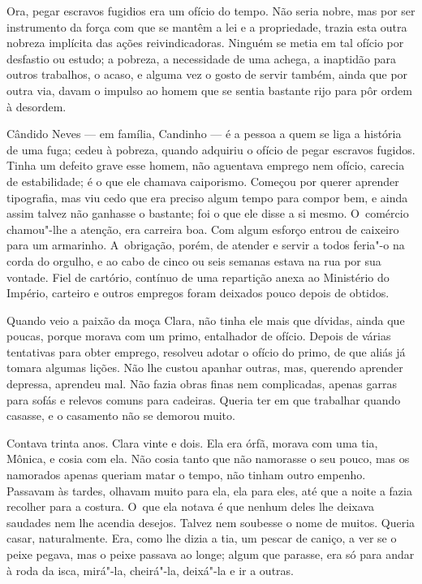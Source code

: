 \begin{linenumbers}
Ora, pegar escravos fugidios era um ofício do tempo. Não seria nobre,
mas por ser instrumento da força com que se mantêm a lei e a
propriedade, trazia esta outra nobreza implícita das ações
reivindicadoras. Ninguém se metia em tal ofício por desfastio ou estudo;
a pobreza, a necessidade de uma achega, a inaptidão para outros
trabalhos, o acaso, e alguma vez o gosto de servir também, ainda que por
outra via, davam o impulso ao homem que se sentia bastante rijo para pôr
ordem à desordem.

Cândido Neves --- em família, Candinho --- é a pessoa a quem se liga a
história de uma fuga; cedeu à pobreza, quando adquiriu o ofício de pegar
escravos fugidos. Tinha um defeito grave esse homem, não aguentava
emprego nem ofício, carecia de estabilidade; é o que ele chamava
caiporismo. Começou por querer aprender tipografia, mas viu cedo que era
preciso algum tempo para compor bem, e ainda assim talvez não ganhasse o
bastante; foi o que ele disse a si mesmo. O~comércio chamou"-lhe a
atenção, era carreira boa. Com algum esforço entrou de caixeiro para um
armarinho. A~obrigação, porém, de atender e servir a todos feria"-o na
corda do orgulho, e ao cabo de cinco ou seis semanas estava na rua por
sua vontade. Fiel de cartório, contínuo de uma repartição anexa ao
Ministério do Império, carteiro e outros empregos foram deixados pouco
depois de obtidos.

Quando veio a paixão da moça Clara, não tinha ele mais que dívidas,
ainda que poucas, porque morava com um primo, entalhador de ofício.
Depois de várias tentativas para obter emprego, resolveu adotar o ofício
do primo, de que aliás já tomara algumas lições. Não lhe custou apanhar
outras, mas, querendo aprender depressa, aprendeu mal. Não fazia obras
finas nem complicadas, apenas garras para sofás e relevos comuns para
cadeiras. Queria ter em que trabalhar quando casasse, e o casamento não
se demorou muito.

Contava trinta anos. Clara vinte e dois. Ela era órfã, morava com uma
tia, Mônica, e cosia com ela. Não cosia tanto que não namorasse o seu
pouco, mas os namorados apenas queriam matar o tempo, não tinham outro
empenho. Passavam às tardes, olhavam muito para ela, ela para eles, até
que a noite a fazia recolher para a costura. O~que ela notava é que
nenhum deles lhe deixava saudades nem lhe acendia desejos. Talvez nem
soubesse o nome de muitos. Queria casar, naturalmente. Era, como lhe
dizia a tia, um pescar de caniço, a ver se o peixe pegava, mas o peixe
passava ao longe; algum que parasse, era só para andar à roda da isca,
mirá"-la, cheirá"-la, deixá"-la e ir a outras.


\end{linenumbers}
